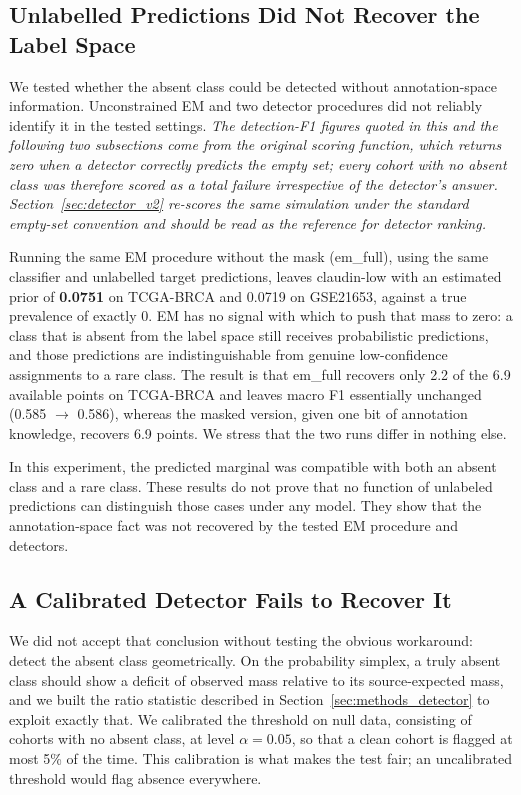 \documentclass[10pt,journal,compsoc,twocolumn]{IEEEtran}
\begin{document}
\subsection{Unlabelled Predictions Did Not Recover the Label Space}

We tested whether the absent class could be detected without annotation-space information. Unconstrained EM and two detector procedures did not reliably identify it in the tested settings. \emph{The detection-F1 figures quoted in this and the following two subsections come from the original scoring function, which returns zero when a detector correctly predicts the empty set; every cohort with no absent class was therefore scored as a total failure irrespective of the detector's answer. Section~\ref{sec:detector_v2} re-scores the same simulation under the standard empty-set convention and should be read as the reference for detector ranking.}

Running the same EM procedure without the mask (em\_full), using the same classifier and unlabelled target predictions, leaves claudin-low with an estimated prior of \textbf{0.0751} on TCGA-BRCA and 0.0719 on GSE21653, against a true prevalence of exactly 0. EM has no signal with which to push that mass to zero: a class that is absent from the label space still receives probabilistic predictions, and those predictions are indistinguishable from genuine low-confidence assignments to a rare class. The result is that em\_full recovers only 2.2 of the 6.9 available points on TCGA-BRCA and leaves macro F1 essentially unchanged (0.585 $\rightarrow$ 0.586), whereas the masked version, given one bit of annotation knowledge, recovers 6.9 points. We stress that the two runs differ in nothing else.

In this experiment, the predicted marginal was compatible with both an absent class and a rare class. These results do not prove that no function of unlabeled predictions can distinguish those cases under any model. They show that the annotation-space fact was not recovered by the tested EM procedure and detectors.

\subsection{A Calibrated Detector Fails to Recover It}

We did not accept that conclusion without testing the obvious workaround: detect the absent class geometrically. On the probability simplex, a truly absent class should show a deficit of observed mass relative to its source-expected mass, and we built the ratio statistic described in Section~\ref{sec:methods_detector} to exploit exactly that. We calibrated the threshold on null data, consisting of cohorts with no absent class, at level $\alpha = 0.05$, so that a clean cohort is flagged at most 5\% of the time. This calibration is what makes the test fair; an uncalibrated threshold would flag absence everywhere.
\end{document}
